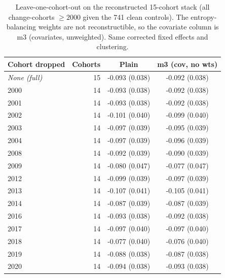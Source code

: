 \begin{table}[t]\centering
\caption{Leave-one-cohort-out on the reconstructed 15-cohort stack (all change-cohorts $\ge 2000$ given the 741 clean controls). The entropy-balancing weights are not reconstructible, so the covariate column is m3 (covariates, unweighted). Same corrected fixed effects and clustering.}
\label{tab:loo-recon15}
\begin{tabular}{lrcc}
\toprule
Cohort dropped & Cohorts & Plain & m3 (cov, no wts) \\
\midrule
\textit{None (full)} & 15 & -0.093 (0.038) & -0.092 (0.038) \\
\midrule
2000 & 14 & -0.093 (0.038) & -0.092 (0.038) \\
2001 & 14 & -0.093 (0.038) & -0.092 (0.038) \\
2002 & 14 & -0.101 (0.040) & -0.099 (0.040) \\
2003 & 14 & -0.097 (0.039) & -0.095 (0.039) \\
2004 & 14 & -0.097 (0.039) & -0.096 (0.039) \\
2008 & 14 & -0.092 (0.039) & -0.090 (0.039) \\
2009 & 14 & -0.080 (0.047) & -0.077 (0.047) \\
2012 & 14 & -0.099 (0.039) & -0.097 (0.039) \\
2013 & 14 & -0.107 (0.041) & -0.105 (0.041) \\
2014 & 14 & -0.087 (0.039) & -0.087 (0.039) \\
2016 & 14 & -0.093 (0.038) & -0.092 (0.038) \\
2017 & 14 & -0.097 (0.040) & -0.097 (0.040) \\
2018 & 14 & -0.077 (0.040) & -0.076 (0.040) \\
2019 & 14 & -0.088 (0.038) & -0.087 (0.038) \\
2020 & 14 & -0.094 (0.038) & -0.093 (0.038) \\
\bottomrule
\end{tabular}
\end{table}
